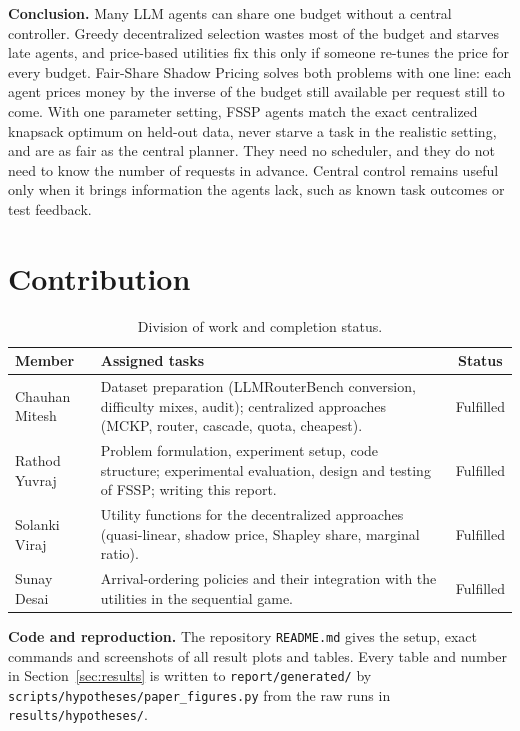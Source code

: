 \documentclass{article}
\begin{document}
\textbf{Conclusion.} Many LLM agents can share one budget without a central controller. Greedy decentralized selection wastes most of the budget and starves late agents, and price-based utilities fix this only if someone re-tunes the price for every budget. Fair-Share Shadow Pricing solves both problems with one line: each agent prices money by the inverse of the budget still available per request still to come. With one parameter setting, FSSP agents match the exact centralized knapsack optimum on held-out data, never starve a task in the realistic setting, and are as fair as the central planner. They need no scheduler, and they do not need to know the number of requests in advance. Central control remains useful only when it brings information the agents lack, such as known task outcomes or test feedback.

\section{Contribution}

\begin{table}[H]
\centering
\footnotesize
\caption{Division of work and completion status.}
\label{tab:contrib}
\begin{tabular}{l p{11.4cm} c}
\toprule
\textbf{Member} & \textbf{Assigned tasks} & \textbf{Status} \\
\midrule
Chauhan Mitesh & Dataset preparation (LLMRouterBench conversion, difficulty mixes, audit); centralized approaches (MCKP, router, cascade, quota, cheapest). & Fulfilled \\
Rathod Yuvraj  & Problem formulation, experiment setup, code structure; experimental evaluation, design and testing of FSSP; writing this report. & Fulfilled \\
Solanki Viraj  & Utility functions for the decentralized approaches (quasi-linear, shadow price, Shapley share, marginal ratio). & Fulfilled \\
Sunay Desai    & Arrival-ordering policies and their integration with the utilities in the sequential game. & Fulfilled \\
\bottomrule
\end{tabular}
\end{table}

\textbf{Code and reproduction.} The repository \texttt{README.md} gives the setup, exact commands and screenshots of all result plots and tables. Every table and number in Section~\ref{sec:results} is written to \texttt{report/generated/} by \texttt{scripts/hypotheses/paper\_figures.py} from the raw runs in \texttt{results/hypotheses/}.

{\footnotesize


}
\end{document}
